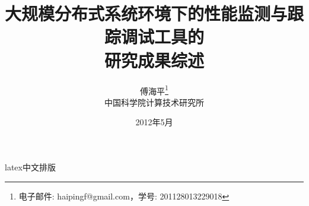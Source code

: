 \documentclass[12pt]{article}
\begin{document}
\begin{CJK*}{GBK}{song}
\title{大规模分布式系统环境下的性能监测与跟踪调试工具的\\研究成果综述}
\author{傅海平\footnote{电子邮件: haipingf@gmail.com，学号: 201128013229018}\\
中国科学院计算技术研究所\\}

\date{2012年5月}
\maketitle
\newpage
latex中文排版
\end{CJK*}
\end{document}
